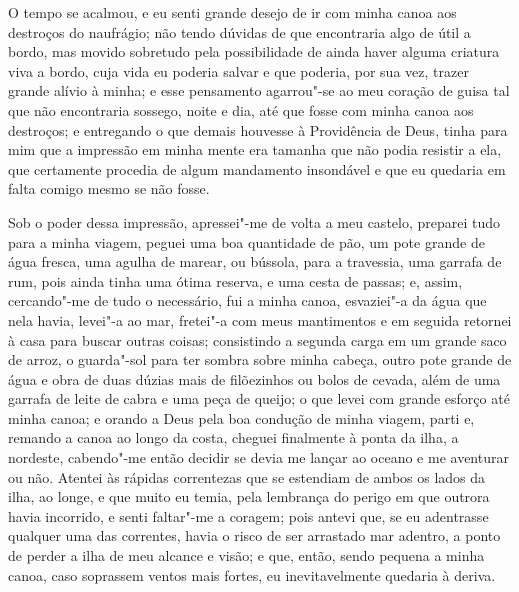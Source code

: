 O tempo se acalmou, e eu senti grande desejo de ir com minha canoa aos
destroços do naufrágio; não tendo dúvidas de que encontraria algo de
útil a bordo, mas movido sobretudo pela possibilidade de ainda haver
alguma criatura viva a bordo, cuja vida eu poderia salvar e que poderia,
por sua vez, trazer grande alívio à minha; e esse pensamento agarrou"-se
ao meu coração de guisa tal que não encontraria sossego, noite e dia,
até que fosse com minha canoa aos destroços; e entregando o que demais
houvesse à Providência de Deus, tinha para mim que a impressão em minha
mente era tamanha que não podia resistir a ela, que certamente procedia
de algum mandamento insondável e que eu quedaria em falta comigo mesmo
se não fosse.

Sob o poder dessa impressão, apressei"-me de volta a meu castelo,
preparei tudo para a minha viagem, peguei uma boa quantidade de pão, um
pote grande de água fresca, uma agulha de marear, ou bússola, para a
travessia, uma garrafa de rum, pois ainda tinha uma ótima reserva, e uma
cesta de passas; e, assim, cercando"-me de tudo o necessário, fui a minha
canoa, esvaziei"-a da água que nela havia, levei"-a ao mar, fretei"-a com
meus mantimentos e em seguida retornei à casa para buscar outras coisas;
consistindo a segunda carga em um grande saco de arroz, o guarda"-sol
para ter sombra sobre minha cabeça, outro pote grande de água e obra de
duas dúzias mais de filõezinhos ou bolos de cevada, além de uma garrafa
de leite de cabra e uma peça de queijo; o que levei com grande esforço
até minha canoa; e orando a Deus pela boa condução de minha viagem,
parti e, remando a canoa ao longo da costa, cheguei finalmente à ponta
da ilha, a nordeste, cabendo"-me então decidir se devia me lançar ao
oceano e me aventurar ou não. Atentei às rápidas correntezas que se
estendiam de ambos os lados da ilha, ao longe, e que muito eu temia,
pela lembrança do perigo em que outrora havia incorrido, e senti
faltar"-me a coragem; pois antevi que, se eu adentrasse qualquer uma das
correntes, havia o risco de ser arrastado mar adentro, a ponto de perder
a ilha de meu alcance e visão; e que, então, sendo pequena a minha
canoa, caso soprassem ventos mais fortes, eu inevitavelmente quedaria à
deriva.

